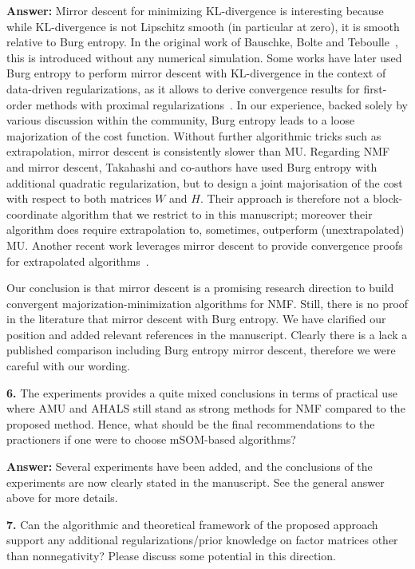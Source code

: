\documentclass[10pt]{article} %
\newcommand{\answer}[1]{{\textbf{Answer:} \color{blue} #1}}
\begin{document}
\answer{
Mirror descent for minimizing KL-divergence is interesting because while KL-divergence is not Lipschitz smooth (in particular at zero), it is smooth relative to Burg entropy. In the original work of Bauschke, Bolte and Teboulle~\cite{bauschkeDescentLemmaLipschitz2017}, this is introduced without any numerical simulation. Some works have later used Burg entropy to perform mirror descent with KL-divergence in the context of data-driven regularizations, as it allows to derive convergence results for first-order methods with proximal regularizations~\cite{huraultConvergentBregmanPlugandPlay2023b}. In our experience, backed solely by various discussion within the community, Burg entropy leads to a loose majorization of the cost function. Without further algorithmic tricks such as extrapolation, mirror descent is consistently slower than MU. Regarding NMF and mirror descent, Takahashi and co-authors have used Burg entropy with additional quadratic regularization, but to design a joint majorisation of the cost with respect to both matrices $W$ and $H$. Their approach is therefore not a block-coordinate algorithm that we restrict to in this manuscript; moreover their algorithm does require extrapolation to, sometimes, outperform (unextrapolated) MU. Another recent work leverages mirror descent to provide convergence proofs for extrapolated algorithms~\cite{hienBlockMajorizationMinimization2025}.

Our conclusion is that mirror descent is a promising research direction to build convergent majorization-minimization algorithms for NMF. Still, there is no proof in the literature that mirror descent with Burg entropy. We have clarified our position and added relevant references in the manuscript.  Clearly there is a lack a published comparison including Burg entropy mirror descent, therefore we were careful with our wording.
}

\textbf{6.} The experiments provides a quite mixed conclusions in terms of practical use where AMU and AHALS still stand as strong methods for NMF compared to the proposed method. Hence, what should be the final recommendations to the practioners if one were to choose mSOM-based algorithms?

\answer{
Several experiments have been added, and the conclusions of the experiments are now clearly stated in the manuscript. See the general answer above for more details. 
}

\textbf{7.} Can the algorithmic and theoretical framework of the proposed approach support any additional regularizations/prior knowledge on factor matrices other than nonnegativity? Please discuss some potential in this direction.
\end{document}
